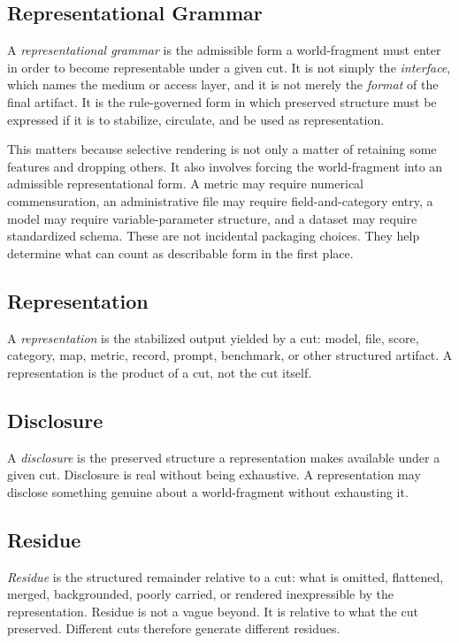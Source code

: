 \documentclass[11pt]{article}
\renewcommand{\emph}[1]{\textit{#1}}
\begin{document}
\subsection{Representational Grammar}

A \emph{representational grammar} is the admissible form a world-fragment must enter in order to become representable under a given cut. It is not simply the \emph{interface}, which names the medium or access layer, and it is not merely the \emph{format} of the final artifact. It is the rule-governed form in which preserved structure must be expressed if it is to stabilize, circulate, and be used as representation.

This matters because selective rendering is not only a matter of retaining some features and dropping others. It also involves forcing the world-fragment into an admissible representational form. A metric may require numerical commensuration, an administrative file may require field-and-category entry, a model may require variable-parameter structure, and a dataset may require standardized schema. These are not incidental packaging choices. They help determine what can count as describable form in the first place.

\subsection{Representation}

A \emph{representation} is the stabilized output yielded by a cut: model, file, score, category, map, metric, record, prompt, benchmark, or other structured artifact. A representation is the product of a cut, not the cut itself.

\subsection{Disclosure}

A \emph{disclosure} is the preserved structure a representation makes available under a given cut. Disclosure is real without being exhaustive. A representation may disclose something genuine about a world-fragment without exhausting it. \cite{frigg_nguyen_scientific_representation_sep,chakravartty_scientific_realism_sep}

\subsection{Residue}

\emph{Residue} is the structured remainder relative to a cut: what is omitted, flattened, merged, backgrounded, poorly carried, or rendered inexpressible by the representation. Residue is not a vague beyond. It is relative to what the cut preserved. Different cuts therefore generate different residues.
\end{document}
